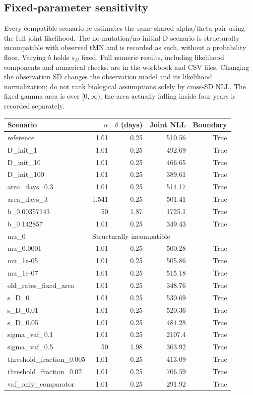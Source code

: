 \subsection{Fixed-parameter sensitivity}
Every compatible scenario re-estimates the same shared alpha/theta pair using the full joint likelihood. The no-mutation/no-initial-D scenario is structurally incompatible with observed tMN and is recorded as such, without a probability floor. Varying $b$ holds $s_D$ fixed. Full numeric results, including likelihood components and numerical checks, are in the workbook and CSV files.
Changing the observation SD changes the observation model and its likelihood normalization; do not rank biological assumptions solely by cross-SD NLL. The fixed gamma area is over $[0,\infty)$; the area actually falling inside four years is recorded separately.
\begin{longtable}{lrrrr}\toprule
Scenario & $\alpha$ & $\theta$ (days) & Joint NLL & Boundary\\\midrule\endhead
reference & 1.01 & 0.25 & 510.56 & True \\
D\_init\_1 & 1.01 & 0.25 & 492.69 & True \\
D\_init\_10 & 1.01 & 0.25 & 466.65 & True \\
D\_init\_100 & 1.01 & 0.25 & 389.61 & True \\
area\_days\_0.3 & 1.01 & 0.25 & 514.17 & True \\
area\_days\_3 & 1.541 & 0.25 & 501.41 & True \\
b\_0.00357143 & 50 & 1.87 & 1725.1 & True \\
b\_0.142857 & 1.01 & 0.25 & 349.43 & True \\
mu\_0 & \multicolumn{4}{l}{Structurally incompatible} \\
mu\_0.0001 & 1.01 & 0.25 & 500.28 & True \\
mu\_1e-05 & 1.01 & 0.25 & 505.86 & True \\
mu\_1e-07 & 1.01 & 0.25 & 515.18 & True \\
old\_rates\_fixed\_area & 1.01 & 0.25 & 348.76 & True \\
s\_D\_0 & 1.01 & 0.25 & 530.69 & True \\
s\_D\_0.01 & 1.01 & 0.25 & 520.36 & True \\
s\_D\_0.05 & 1.01 & 0.25 & 484.28 & True \\
sigma\_vaf\_0.1 & 1.01 & 0.25 & 2107.4 & True \\
sigma\_vaf\_0.5 & 50 & 1.98 & 303.92 & True \\
threshold\_fraction\_0.005 & 1.01 & 0.25 & 413.09 & True \\
threshold\_fraction\_0.02 & 1.01 & 0.25 & 706.59 & True \\
vaf\_only\_comparator & 1.01 & 0.25 & 291.92 & True \\
\bottomrule\end{longtable}
